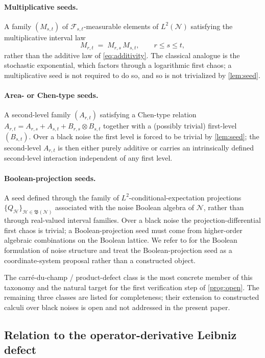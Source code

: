 \documentclass[11pt,reqno]{amsart}
\theoremstyle{plain}
\theoremstyle{definition}
\theoremstyle{remark}
\begin{document}
\paragraph{Multiplicative seeds.}
A family $(M_{s,t})$ of $\mathcal F_{s,t}$-measurable elements of
$L^{2}(\mathcal N)$ satisfying the multiplicative interval law
\[
  M_{r,t}\;=\;M_{r,s}\,M_{s,t},\qquad r\le s\le t,
\]
rather than the additive law of \eqref{eq:additivity}. The classical
analogue is the stochastic exponential, which factors through a
logarithmic first chaos; a multiplicative seed is not required to
do so, and so is not trivialized by \cref{lem:seed}.

\paragraph{Area- or Chen-type seeds.}
A second-level family $(A_{r,t})$ satisfying a Chen-type relation
$A_{r,t}=A_{r,s}+A_{s,t}+B_{r,s}\otimes B_{s,t}$ together with a
(possibly trivial) first-level $(B_{s,t})$. Over a black noise the
first level is forced to be trivial by \cref{lem:seed}; the
second-level $A_{r,t}$ is then either purely additive or carries an
intrinsically defined second-level interaction independent of any
first level.

\paragraph{Boolean-projection seeds.}
A seed defined through the family of $L^{2}$-conditional-expectation
projections $\{Q_{\mathcal H}\}_{\mathcal H\in\mathfrak B(\mathcal N)}$
associated with the noise Boolean algebra of $\mathcal N$, rather
than through real-valued interval families. Over a black noise the
projection-differential first chaos is trivial; a Boolean-projection
seed must come from higher-order algebraic combinations on the
Boolean lattice. We refer to \cite{Tsirelson2004,TsirelsonVershik1998}
for the Boolean formulation of noise structure and treat the
Boolean-projection seed as a coordinate-system proposal rather than
a constructed object.

\medskip
The carr\'e-du-champ / product-defect class is the most concrete
member of this taxonomy and the natural target for the first
verification step of \cref{prog:open}. The remaining three classes
are listed for completeness; their extension to constructed calculi
over black noises is open and not addressed in the present paper.

\subsection{Relation to the operator-derivative Leibniz defect}\label{sec:twopoint-relation}
\end{document}
